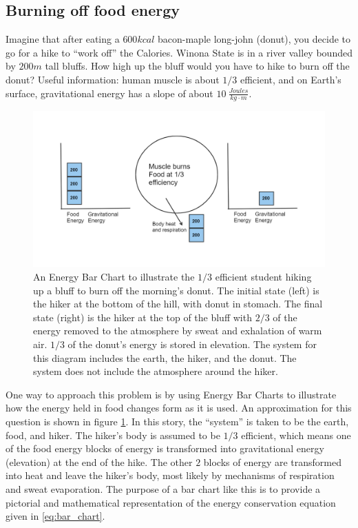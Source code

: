 \documentclass[12pt]{iopart}
\begin{document}
\subsection{Burning off food energy}
Imagine that after eating a $600kcal$ bacon-maple long-john (donut), you decide to go for a hike to ``work off'' the Calories.  Winona State  is in a river valley bounded by $200m$ tall bluffs.  How high up the bluff would you have to hike to burn off the donut?  
Useful information: human muscle is about $1/3$ efficient, and on Earth's surface, gravitational energy has a slope of about $10~\frac{Joules}{kg\cdot m}$.

\begin{figure}[h]
\centering
\includegraphics[width=\columnwidth]{bar_chart.png}
\caption{An Energy Bar Chart to illustrate the $1/3$ efficient student hiking up a bluff to burn off the morning's donut.  The initial state (left) is the hiker at the bottom of the hill, with donut in stomach.  The final state (right) is the hiker at the top of the bluff with $2/3$ of the energy removed to the atmosphere by sweat and exhalation of warm air. $1/3$ of the donut's energy is stored in elevation.  The system for this diagram includes the earth, the hiker, and the donut.  The system does not include the atmosphere around the hiker.  
}
\label{bar_chart}
\end{figure}

One way to approach this problem is by using Energy Bar Charts \cite{energy_bar_charts} to illustrate how the energy held in food changes form as it is used.  An approximation for this question is shown in figure \ref{bar_chart}.  
In this story, the ``system'' is taken to be the earth, food, and hiker.  The hiker's body is assumed to be $1/3$ efficient, which means one of the food energy blocks of energy is transformed into gravitational energy (elevation) at the end of the hike.  
The other $2$ blocks of energy are transformed into heat and leave the hiker's body, most likely by mechanisms of respiration and sweat evaporation. The purpose of a bar chart like this is to provide a pictorial and mathematical representation of the energy conservation equation given in \ref{eq:bar_chart}.         
\end{document}
